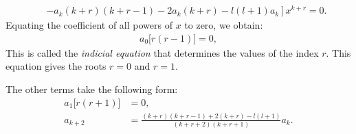 \begin{enumerate}[label={(\arabic*)}]
\begin{enumerate}[label={(\alph*)}]
\begin{align}
        &\hspace{10pt}\left. - a_k (k+r) (k+r-1) - 2 a_k (k+r) - l(l+1) a_k \right] x^{k+r} = 0.
    \end{align}
    Equating the coefficient of all powers of $x$ to zero, we obtain:
    \begin{align}
        a_0 \bigg[ r(r-1) \bigg] = 0, 
    \end{align}
    This is called the \textit{indicial equation} that determines the values of the index $r$. This equation gives the roots $r = 0$ and $r = 1$.
    
    The other terms take the following form:
    \begin{align}
        a_{1} \bigg[ r(r+1) \bigg] &= 0,\\
        a_{k+2} &= \frac{(k+r)(k+r-1)+2(k+r)-l(l+1)}{(k+r+2)(k+r+1)}a_k.\label{eq:first-frebonius-type}
    \end{align}

\end{enumerate}
\end{enumerate}
